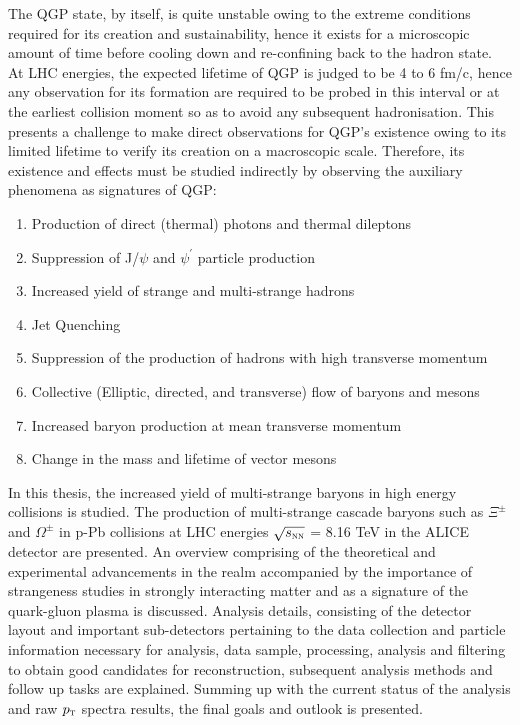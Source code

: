 The QGP state, by itself, is quite unstable owing to the extreme conditions required for its creation and sustainability, hence it exists for a
microscopic amount of time before cooling down and re-confining back to the hadron state. At LHC energies, the expected lifetime of QGP is
judged to be 4 to 6 fm/c\cite{Sahoo:2010}, hence any observation for its formation are required to be probed in this interval or at the
earliest collision moment so as to avoid any subsequent hadronisation. This presents a challenge to make direct observations for QGP's existence
owing to its limited lifetime to verify its creation on a macroscopic scale.
Therefore, its existence and effects must be studied indirectly by observing the auxiliary phenomena as signatures of QGP\cite{Bass:1999}$\colon$
\begin{enumerate}
  \item Production of direct (thermal) photons and thermal dileptons
  \item Suppression of J/$\psi$ and $\psi^{\prime}$ particle production
  \item Increased yield of strange and multi-strange hadrons
  \item Jet Quenching
  \item Suppression of the production of hadrons with high transverse momentum
  \item Collective (Elliptic, directed, and transverse) flow of baryons and mesons
  \item Increased baryon production at mean transverse momentum
  \item Change in the mass and lifetime of vector mesons
\end{enumerate}

In this thesis, the increased yield of multi-strange baryons in high energy collisions is studied. The production of multi-strange cascade baryons
such as $\Xi^{\pm}$ and $\Omega^{\pm}$ in p-Pb collisions at LHC energies $\sqrt{s_{\textnormal{\sc nn}}}$ = 8.16 TeV in the ALICE detector are presented. An overview
comprising of the theoretical and experimental advancements in the realm accompanied by the importance of strangeness studies in strongly interacting
matter and as a signature of the quark-gluon plasma is discussed. Analysis details, consisting of the detector layout and important sub-detectors
pertaining to the data collection and particle information necessary for analysis, data sample, processing, analysis and filtering
to obtain good candidates for reconstruction, subsequent analysis methods and follow up tasks are explained. Summing up with the current status of
the analysis and raw $p_{\textnormal{\sc t}}$ spectra results, the final goals and outlook is presented.



